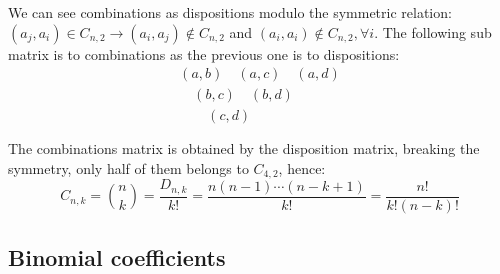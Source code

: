 We can see combinations as dispositions modulo the symmetric relation:
$(a_j,a_i) \in C_{n,2} \rightarrow (a_i, a_j) \not \in C_{n,2}$ and $(a_i,a_i)\not
\in C_{n,2}, \forall i$. The following sub matrix is to combinations
as the previous one is to dispositions:
\begin{displaymath}
  \begin{split}
    \left ( a, b \right)\quad
    \left ( a, c \right)\quad
    \left ( a, d \right)\\
    \quad
    \left ( b, c \right)\quad
    \left ( b, d \right)\\
    \quad
    \quad
    \left ( c, d \right)\\
    \quad
    \quad
    \\
  \end{split}
\end{displaymath}
The combinations matrix is obtained by the disposition matrix, breaking
the symmetry, only half of them belongs to $C_{4,2}$, hence:
$$C_{n,k} = {{n}\choose{k}} = \frac{D_{n,k}}{k!} =
\frac{n(n-1)\cdots(n-k+1)}{k!} = \frac{n!}{k!(n-k)!} $$

\subsection{Binomial coefficients}

